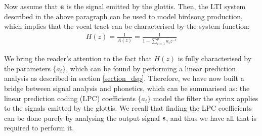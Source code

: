 \documentclass[../main.tex]{subfiles}
\begin{document}
\par Now assume that $\mathbf{e}$ is the signal emitted by the glottis. Then, the LTI system described in the above paragraph can be used to model birdsong production, which implies that the vocal tract can be characterised by the system function:
\begin{align*}
H(z) = \frac{1}{A(z)} = \frac{1}{1-\sum_{i=1}^pa_iz^{-i}}
\end{align*}
\par We bring the reader's attention to the fact that $H(z)$ is fully characterised by the parameters $\{a_i\}$, which can be found by performing a linear prediction analysis as described in section \ref{section_dsp}. Therefore, we have now built a bridge between signal analysis and phonetics, which can be summarised as: the linear prediction coding (LPC) coefficients  $\{a_i\}$ model the filter the syrinx applies to the signals emitted by the glottis. We recall that finding the LPC coefficients can be done purely by analysing the output signal $\mathbf{s}$, and thus we have all that is required to perform it.
\end{document}
